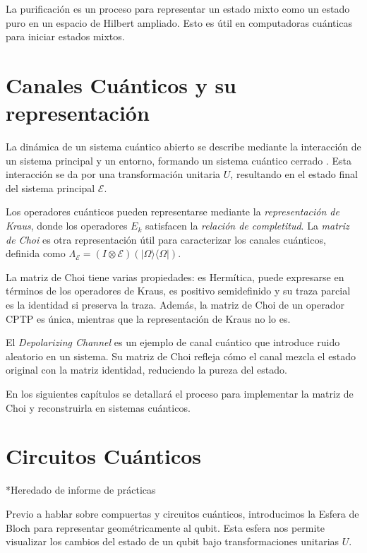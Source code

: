 \documentclass[letterpaper,12pt]{thesisECFM}
\theoremstyle{plain}
\theoremstyle{definition}
\theoremstyle{remark}
\newcommand{\1}{\mathbb{1}}
\begin{document}
La purificación es un proceso para representar un estado mixto como un estado puro en un espacio de Hilbert ampliado. Esto es útil en computadoras cuánticas para iniciar estados mixtos. \par 



\section{Canales Cuánticos y su representación}
La dinámica de un sistema cuántico abierto se describe mediante la interacción de un sistema principal y un entorno, formando un sistema cuántico cerrado \cite{nielsen_chuang_2011}. Esta interacción se da por una transformación unitaria $U$, resultando en el estado final del sistema principal $\mathcal{E}$. \par 

Los operadores cuánticos pueden representarse mediante la \textit{representación de Kraus}, donde los operadores ${E_k}$ satisfacen la \textit{relación de completitud}. La \textit{matriz de Choi} es otra representación útil para caracterizar los canales cuánticos, definida como $\Lambda_{\mathcal{E}} = (I \otimes \mathcal{E})(|\Omega\rangle\langle\Omega|)$. \par 

La matriz de Choi tiene varias propiedades: es Hermítica, puede expresarse en términos de los operadores de Kraus, es positivo semidefinido y su traza parcial es la identidad si preserva la traza. Además, la matriz de Choi de un operador CPTP es única, mientras que la representación de Kraus no lo es. \par 

El \textit{Depolarizing Channel} es un ejemplo de canal cuántico que introduce ruido aleatorio en un sistema. Su matriz de Choi refleja cómo el canal mezcla el estado original con la matriz identidad, reduciendo la pureza del estado. \par 

En los siguientes capítulos se detallará el proceso para implementar la matriz de Choi y reconstruirla en sistemas cuánticos. \par 
\section{Circuitos Cuánticos}
*Heredado de informe de prácticas 

Previo a hablar sobre compuertas y circuitos cuánticos, introducimos la Esfera de Bloch para representar geométricamente al qubit. Esta esfera nos permite visualizar los cambios del estado de un qubit bajo transformaciones unitarias $U$. \par 
\end{document}
